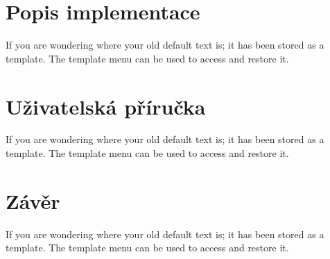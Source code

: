 \documentclass[11pt]{article}
\begin{document}
\section{Popis implementace}
If you are wondering where your old default text is; it has been stored as a template. The template menu can be used to access and restore it. 

\section{Uživatelská příručka}
If you are wondering where your old default text is; it has been stored as a template. The template menu can be used to access and restore it. 

\section{Závěr}
If you are wondering where your old default text is; it has been stored as a template. The template menu can be used to access and restore it. 
\end{document}
